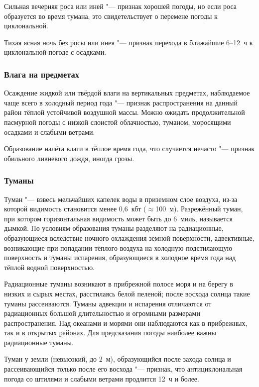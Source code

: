  Сильная вечерняя роса или иней "--- признак хорошей погоды, но
если роса образуется во время тумана, это свидетельствует о перемене
погоды к циклональной.

 Тихая ясная ночь без росы или инея "--- признак перехода в ближайшие
6--12~ч к циклональной погоде с осадками.

\subsubsection{Влага на предметах}

 Осаждение жидкой или твёрдой влаги на вертикальных предметах,
наблюдаемое чаще всего в холодный период года "--- признак
распространения на данный район тёплой устойчивой воздушной массы.
Можно ожидать продолжительной пасмурной погоды с низкой слоистой
облачностью, туманом, моросящими осадками и слабыми ветрами.

 Образование налёта влаги в тёплое время года, что случается
нечасто "--- признак обильного ливневого дождя, иногда грозы.

\subsubsection{Туманы}

Туман "--- взвесь мельчайших капелек воды в приземном слое воздуха,
из-за которой видимость становится менее 0,6~кбт
($\approx{}$100~м). Разрежённый туман, при котором горизонтальная
видимость может быть до 6~миль, называется дымкой. По условиям
образования туманы разделяют на радиационные, образующиеся вследствие
ночного охлаждения земной поверхности, адвективные, возникающие при
попадании тёплого воздуха на холодную подстилающую поверхность и
туманы испарения, образующиеся в холодное время года над тёплой водной
поверхностью.

Радиационные туманы возникают в прибрежной полосе моря и на берегу в
низких и сырых местах, расстилаясь белой пеленой; после восхода солнца
такие туманы рассеиваются. Туманы адвекции и испарения отличаются от
радиационных большой длительностью и огромными размерами
распространения. Над океанами и морями они наблюдаются как в
прибрежных, так и в открытых районах. Для предсказания погоды наиболее
важны радиационные туманы.

 Туман у земли (невысокий, до 2~м), образующийся после захода
солнца и рассеивающийся только после его восхода "--- признак, что
антициклональная погода со штилями и слабыми ветрами продлится 12~ч и
более.

